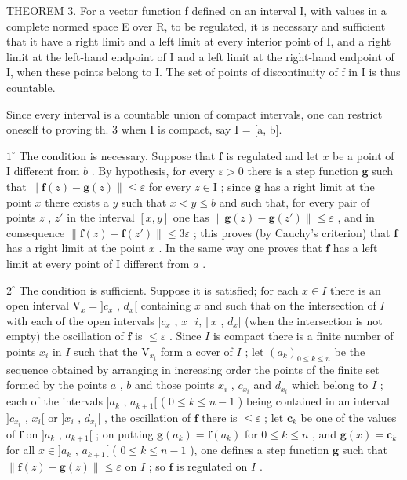 THEOREM 3. For a vector function f defined on an interval I, with values in a complete normed space E over R, to be regulated, it is necessary and sufficient that it have a right limit and a left limit at every interior point of I, and a right limit at the left-hand endpoint of I and a left limit at the right-hand endpoint of I, when these points belong to I. The set of points of discontinuity of f in I is thus countable.

Since every interval is a countable union of compact intervals, one can restrict oneself to proving th. 3 when I is compact, say I = {[}a, b{]}.

\(1^{\circ}\) The condition is necessary. Suppose that \(\mathbf{f}\) is regulated and let \(x\) be a point of I different from \(b\) . By hypothesis, for every \(\varepsilon > 0\) there is a step function \(\mathbf{g}\) such that \(\| \mathbf{f}(z) - \mathbf{g}(z) \| \leqslant \varepsilon\) for every \(z \in \mathrm{I}\) ; since \(\mathbf{g}\) has a right limit at the point \(x\) there exists a \(y\) such that \(x < y \leqslant b\) and such that, for every pair of points \(z\) , \(z'\) in the interval \([x, y]\) one has \(\| \mathbf{g}(z) - \mathbf{g}(z') \| \leqslant \varepsilon\) , and in consequence \(\| \mathbf{f}(z) - \mathbf{f}(z') \| \leqslant 3\varepsilon\) ; this proves (by Cauchy's criterion) that \(\mathbf{f}\) has a right limit at the point \(x\) . In the same way one proves that \(\mathbf{f}\) has a left limit at every point of I different from \(a\) .

\(2^{\circ}\) The condition is sufficient. Suppose it is satisfied; for each \(x \in I\) there is an open interval \(\mathrm{V}_x = ]c_x\) , \(d_x[\) containing \(x\) and such that on the intersection of \(I\) with each of the open intervals \(]c_x\) , \(x[i, ]x\) , \(d_x[\) (when the intersection is not empty) the oscillation of \(\mathbf{f}\) is \(\leqslant \varepsilon\) . Since \(I\) is compact there is a finite number of points \(x_i\) in \(I\) such that the \(\mathrm{V}_{x_i}\) form a cover of \(I\) ; let \((a_k)_{0 \leqslant k \leqslant n}\) be the sequence obtained by arranging in increasing order the points of the finite set formed by the points \(a\) , \(b\) and those points \(x_i\) , \(c_{x_i}\) and \(d_{x_i}\) which belong to \(I\) ; each of the intervals \(]a_k\) , \(a_{k+1}[\) ( \(0 \leqslant k \leqslant n-1\) ) being contained in an interval \(]c_{x_i}\) , \(x_i[\) or \(]x_i\) , \(d_{x_i}[\) , the oscillation of \(\mathbf{f}\) there is \(\leqslant \varepsilon\) ; let \(\mathbf{c}_k\) be one of the values of \(\mathbf{f}\) on \(]a_k\) , \(a_{k+1}[\) ; on putting \(\mathbf{g}(a_k) = \mathbf{f}(a_k)\) for \(0 \leqslant k \leqslant n\) , and \(\mathbf{g}(x) = \mathbf{c}_k\) for all \(x \in ]a_k\) , \(a_{k+1}[\) ( \(0 \leqslant k \leqslant n-1\) ), one defines a step function \(\mathbf{g}\) such that \(\| \mathbf{f}(z) - \mathbf{g}(z) \| \leqslant \varepsilon\) on \(I\) ; so \(\mathbf{f}\) is regulated on \(I\) .

